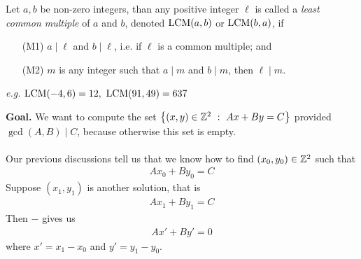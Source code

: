 \vspace*{1em}

\begin{definition}
Let $a,b$ be non-zero integers, than any positive integer $\ell$ is called a \emph{least common multiple} of $a$ and $b$, denoted $\operatorname{LCM}(a,b)$ or $\operatorname{LCM}(b,a)$, if
\begin{itemize}
\item[(M1)] $a\mid \ell$ and $b\mid \ell$, i.e. if $\ell$ is a common multiple; and
\item[(M2)] $m$ is any integer such that $a\mid m$ and $b\mid m$, then $\ell\mid m$.
\end{itemize}
\vspace{0.5em}
\emph{e.g.} $\lcm(-4,6) = 12,\ \lcm(91,49) = 637$
\end{definition}

\vspace{2em}

{\bf\large Goal.} We want to compute the set $\left\{(x,y)\in \mathbb Z^2\ :\ Ax + By = C\right\}$ provided $\gcd(A,B) \mid C$, because otherwise this set is empty.\\
\\
Our previous discussions tell us that we know how to find $(x_0,y_0) \in \mathbb Z^2$ such that
\begin{align*}\label{geq1}
Ax_0 + By_0 = C \tag{1}
\end{align*}
Suppose $(x_1,y_1)$ is another solution, that is
\begin{align*}\label{geq2}
Ax_1 + By_1 = C \tag{2}
\end{align*}
Then  $-$  gives us 
\begin{align*}\label{geql}
Ax' + By' = 0 \tag{L}
\end{align*}
where $x' = x_1 - x_0$ and $y' = y_1 - y_0$.

\vspace*{2em}


